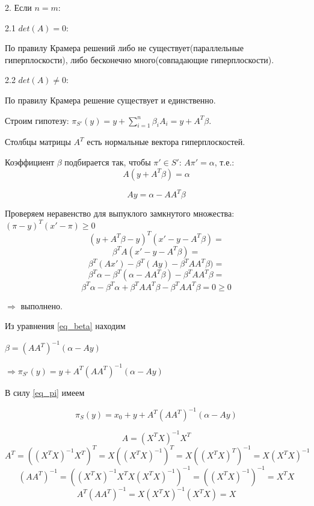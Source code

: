 \documentclass[a4paper,12pt]{article}
\newcommand{\lt}{\left}
\newcommand{\rt}{\right}
\newcommand{\al}{\alpha}
\begin{document}
\vspace{\baselineskip}

2. Если $n = m$:

2.1 $det(A) = 0$:

По правилу Крамера решений либо не существует(параллельные гиперплоскости), либо бесконечно много(совпадающие гиперплоскости).

2.2 $det(A) \neq 0$:

По правилу Крамера решение существует и единственно.

\vspace{\baselineskip}

Строим гипотезу: $\pi_{S'}(y) = y + \sum\limits_{i=1}^n\beta_i A_i = y + A^T \beta$.

Столбцы матрицы $A^T$ есть нормальные вектора гиперплоскостей.

Коэффициент $\beta$ подбирается так, чтобы $\pi' \in S'$: $A \pi' = \al$, т.е.: 
$$A(y + A^T\beta) = \alpha$$

\begin{equation}\label{eq_beta}
Ay = \alpha - A A^T\beta
\end{equation}

Проверяем неравенство для выпуклого замкнутого множества: $(\pi - y)^T(x' - \pi) \ge 0$
$$(y + A^T\beta  - y)^T(x' - y - A^T\beta) = $$
$$ \beta^T A(x' - y - A^T\beta) = $$
$$ \beta^T (Ax') - \beta^T (A y) - \beta^T AA^T \beta) = $$
$$ \beta^T \alpha - \beta^T (\alpha - A A^T\beta) - \beta^T AA^T \beta = $$
$$ \beta^T \alpha - \beta^T \alpha + \beta^T AA^T \beta - \beta^T AA^T \beta = 0 \ge 0$$

$\Rightarrow$ выполнено.

\vspace{\baselineskip}

Из уравнения \ref{eq_beta} находим 

$\beta = (AA^T)^{-1}(\al - Ay)$

$\Rightarrow \pi_{S'}(y) = y + A^T(AA^T)^{-1}(\al - Ay) $

\vspace{\baselineskip}

В силу \ref{eq_pi} имеем 

\begin{equation}\label{eq_pi2}
\pi_{S}(y) = x_0 + y + A^T(AA^T)^{-1}(\al - Ay)
\end{equation}

\vspace{\baselineskip}

$$A = (X^TX)^{-1}X^T$$
$$A^T = \lt((X^TX)^{-1}X^T\rt)^T = X((X^TX)^{-1})^T = X((X^TX)^T)^{-1} = X(X^TX)^{-1}  $$
$$\lt(AA^T\rt)^{-1} = \lt((X^TX)^{-1}X^TX(X^TX)^{-1}\rt)^{-1} = \lt((X^TX)^{-1}\rt)^{-1} = X^TX  $$
$$A^T(AA^T)^{-1} = X(X^TX)^{-1}(X^TX) = X$$
\end{document}
